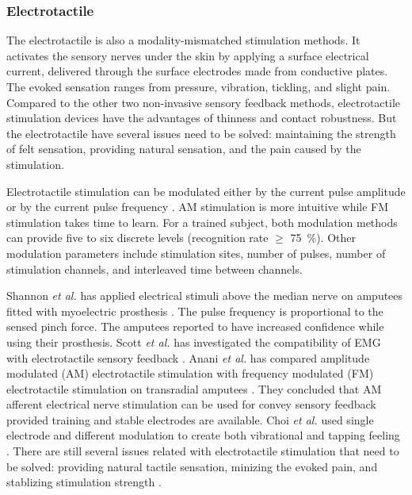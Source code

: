 \subsubsection{Electrotactile}
The electrotactile is also a modality-mismatched stimulation methods. It activates the sensory nerves under the skin by applying a surface electrical current, delivered through the surface electrodes made from conductive plates. The evoked sensation ranges from pressure, vibration, tickling, and slight pain. Compared to the other two non-invasive sensory feedback methods, electrotactile stimulation devices have the advantages of thinness and contact robustness. But the electrotactile have several issues need to be solved: maintaining the strength of felt sensation, providing natural sensation, and the pain caused by the stimulation.

Electrotactile stimulation can be modulated either by the current pulse amplitude or by the current pulse frequency \cite{anani1979discrimination}. AM stimulation is more intuitive while FM stimulation takes time to learn. For a trained subject, both modulation methods can provide five to six discrete levels (recognition rate $\geqslant$  \SI{75}{\%}). Other modulation parameters include stimulation sites, number of pulses, number of stimulation channels, and interleaved time between channels.

Shannon \textit{et al.} has applied electrical stimuli above the median nerve on amputees fitted with myoelectric prosthesis \cite{shannon1979myoelectrically}. The pulse frequency is proportional to the sensed pinch force. The amputees reported to have increased confidence while using their prosthesis.
Scott \textit{et al.} has investigated the compatibility of EMG with electrotactile sensory feedback \cite{scott1980sensory}.
Anani \textit{et al.} has compared amplitude modulated (AM) electrotactile stimulation with frequency modulated (FM) electrotactile stimulation on transradial amputees \cite{anani1979discrimination}. They concluded that AM afferent electrical nerve stimulation can be used for convey sensory feedback provided training and stable electrodes are available.
Choi \textit{et al.} used single electrode and different modulation to create both vibrational and tapping feeling \cite{choi2017mixed}. 
There are still several issues related with electrotactile stimulation that need to be solved: providing natural tactile sensation, minizing the evoked pain, and stablizing stimulation strength \cite{kajimoto2016electro}. 


